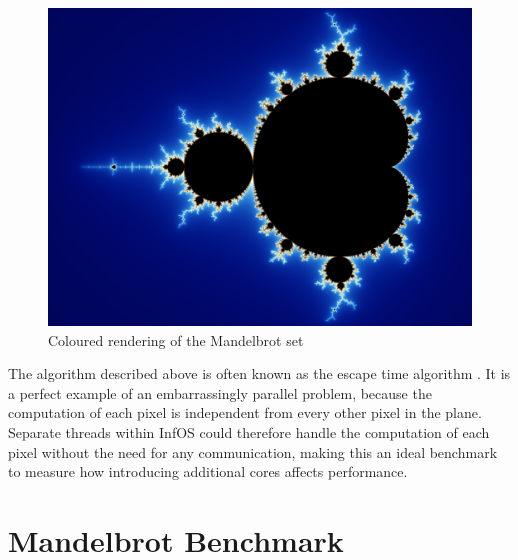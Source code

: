 \documentclass[bsc,frontabs,twoside,singlespacing,parskip,deptreport]{infthesis}     %
\begin{document}
\begin{figure}[h]
    \centering
    \includegraphics[scale=0.6]{mandelbrot.jpg}
    \caption{Coloured rendering of the Mandelbrot set \cite{mandelbrot-set}}
    \label{mandelbrot-vis}
\end{figure}

The algorithm described above is often known as the escape time algorithm \cite{mandelbrot-plotting-algorithms}. It is a perfect example of an embarrassingly parallel problem, because the computation of each pixel is independent from every other pixel in the plane. Separate threads within InfOS could therefore handle the computation of each pixel without the need for any communication, making this an ideal benchmark to measure how introducing additional cores affects performance.

\section{Mandelbrot Benchmark} \label{mb-benchmark}
\end{document}
